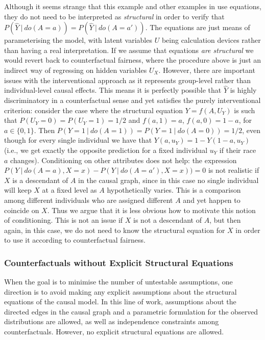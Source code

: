 \documentclass{article}
\begin{document}
Although it seems strange that this example and other examples in
\cite{kilbertus:17} use equations, they do not need to be interpreted
as \emph{structural} in order to verify that $P(\hat Y\ |\ do(A = a))
= P(\hat Y\ |\ do(A = a'))$. The equations are just means of
parameterising the model, with latent variables $U$ being calculation
devices rather than having a real interpretation. If we assume that
equations \emph{are structural} we would revert back to counterfactual fairness,
where the procedure above is just an indirect way of regressing on
hidden variables $U_X$. However, there are important issues with the
interventional approach as it represents group-level rather than
individual-level causal effects. This means it is perfectly possible
that $\hat Y$ is highly discriminatory in a counterfactual sense and yet satisfies the purely
interventional criterion: consider the case where the structural
equation $Y = f(A, U_Y)$ is such that $P(U_Y = 0) = P(U_Y = 1) = 1/2$
and $f(a, 1) = a$, $f(a, 0) = 1 - a$, for $a \in \{0, 1\}$. Then $P(Y
= 1\ |\ do(A = 1)) = P(Y = 1\ |\ do(A = 0)) = 1/2$, even though for
every single individual we have that $Y(a, u_Y) = 1 - Y(1 - a,
u_Y)$ (i.e., we get exactly the opposite prediction for a fixed individual $u_Y$ if their race $a$ changes). Conditioning on other attributes does not help: the expression
$P(Y\ |\ do(A = a), X = x) - P(Y\ |\ do(A = a'), X = x)) = 0$ is not realistic
if $X$ is a descendant of $A$ in the causal graph, since in this case
no single individual will keep $X$ at a fixed level as $A$
hypothetically varies. This is a comparison among different
individuals who are assigned different $A$ and yet happen to coincide on
$X$. Thus we argue that it is less obvious how to motivate this notion of
conditioning. This is not an issue if $X$ is not a descendant of $A$,
but then again, in this case, we do not need to know the structural
equation for $X$ in order to use it according to counterfactual
fairness.

\subsubsection{Counterfactuals without Explicit Structural Equations}

When the goal is to minimise the number of untestable assumptions,
one direction is to avoid making any explicit assumptions about the structural equations of the causal model.
In this line of work, assumptions about the directed edges in the causal graph and a
parametric formulation for the observed distributions are allowed,
as well as independence constraints among counterfactuals. However,
no explicit structural equations are allowed.
\end{document}
